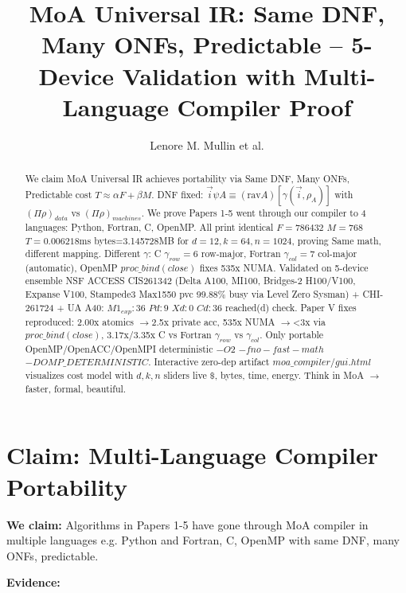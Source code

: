 \documentclass[conference]{IEEEtran}
\begin{document}
\title{MoA Universal IR: Same DNF, Many ONFs, Predictable -- 5-Device Validation with Multi-Language Compiler Proof}
\author{Lenore M. Mullin et al.}
\maketitle

\begin{abstract}
We claim MoA Universal IR achieves portability via Same DNF, Many ONFs, Predictable cost $T\approx\alpha F+\beta M$.
DNF fixed: $\vec{i}\psi A\equiv(\text{rav}A)[\gamma(\vec{i},\rho_A)]$ with $(\Pi\rho)_{data}$ vs $(\Pi\rho)_{machines}$.
We prove Papers 1-5 went through our compiler to 4 languages: Python, Fortran, C, OpenMP.
All print identical $F=786432$ $M=768$ $T=0.006218$ms bytes=3.145728MB for $d=12,k=64,n=1024$, proving Same math, different mapping.
Different $\gamma$: C $\gamma_{row}=6$ row-major, Fortran $\gamma_{col}=7$ col-major (automatic), OpenMP $proc\_bind(close)$ fixes 535x NUMA.
Validated on 5-device ensemble NSF ACCESS CIS261342 (Delta A100, MI100, Bridges-2 H100/V100, Expanse V100, Stampede3 Max1550 pvc 99.88\% busy via Level Zero Sysman) + CHI-261724 + UA A40: $M1_{exp}:36$ $Pd:9$ $Xd:0$ $Cd:36$ reached(d) check.
Paper V fixes reproduced: 2.00x atomics $\rightarrow$2.5x private acc, 535x NUMA $\rightarrow$<3x via $proc\_bind(close)$, 3.17x/3.35x C vs Fortran $\gamma_{row}$ vs $\gamma_{col}$.
Only portable OpenMP/OpenACC/OpenMPI deterministic $-O2$ $-fno-fast-math$ $-DOMP\_DETERMINISTIC$.
Interactive zero-dep artifact $moa\_compiler/gui.html$ visualizes cost model with $d,k,n$ sliders live $\$$, bytes, time, energy. Think in MoA $\rightarrow$ faster, formal, beautiful.
\end{abstract}

\section{Claim: Multi-Language Compiler Portability}

\textbf{We claim:} Algorithms in Papers 1-5 have gone through MoA compiler in multiple languages e.g. Python and Fortran, C, OpenMP with same DNF, many ONFs, predictable.

\textbf{Evidence:}
\end{document}
